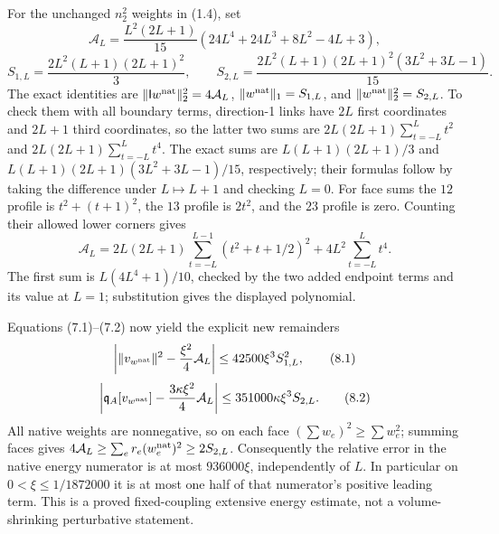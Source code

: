 \documentclass[
]{article}
\begin{document}
For the unchanged \(n_2^2\) weights in (1.4), set \[
\mathcal A_L=\frac{L^2(2L+1)}{15}
 (24L^4+24L^3+8L^2-4L+3),
\] \[
S_{1,L}=\frac{2L^2(L+1)(2L+1)^2}{3},\qquad
S_{2,L}=\frac{2L^2(L+1)(2L+1)^2(3L^2+3L-1)}{15}.
\] The exact identities are
\(\|\mathsf Iw^{\rm nat}\|_2^2=4\mathcal A_L\),
\(\|w^{\rm nat}\|_1=S_{1,L}\), and \(\|w^{\rm nat}\|_2^2=S_{2,L}\). To
check them with all boundary terms, direction-1 links have \(2L\) first
coordinates and \(2L+1\) third coordinates, so the latter two sums are
\(2L(2L+1)\sum_{t=-L}^Lt^2\) and \(2L(2L+1)\sum_{t=-L}^Lt^4\). The exact
sums are \(L(L+1)(2L+1)/3\) and \(L(L+1)(2L+1)(3L^2+3L-1)/15\),
respectively; their formulas follow by taking the difference under
\(L\mapsto L+1\) and checking \(L=0\). For face sums the \(12\) profile
is \(t^2+(t+1)^2\), the \(13\) profile is \(2t^2\), and the \(23\)
profile is zero. Counting their allowed lower corners gives \[
\mathcal A_L=2L(2L+1)\sum_{t=-L}^{L-1}(t^2+t+1/2)^2
                  +4L^2\sum_{t=-L}^{L}t^4.
\] The first sum is \(L(4L^4+1)/10\), checked by the two added endpoint
terms and its value at \(L=1\); substitution gives the displayed
polynomial.

Equations (7.1)--(7.2) now yield the explicit new remainders \[
\left|\|v_{w^{\rm nat}}\|^2-\frac{\xi^2}{4}\mathcal A_L\right|
 \le42500\xi^3 S_{1,L}^2,                                    \tag{8.1}
\] \[
\left|\mathfrak q_A[v_{w^{\rm nat}}]
          -\frac{3\kappa\xi^2}{4}\mathcal A_L\right|
 \le351000\kappa\xi^3 S_{2,L}.                               \tag{8.2}
\] All native weights are nonnegative, so on each face
\((\sum w_e)^2\ge\sum w_e^2\); summing faces gives
\(4\mathcal A_L\ge\sum_e r_e(w_e^{\rm nat})^2\ge2S_{2,L}\). Consequently
the relative error in the native energy numerator is at most
\(936000\xi\), independently of \(L\). In particular on
\(0<\xi\le1/1872000\) it is at most one half of that numerator's
positive leading term. This is a proved fixed-coupling extensive energy
estimate, not a volume-shrinking perturbative statement.
\end{document}
